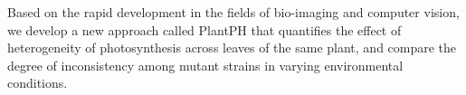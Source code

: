 \documentclass{bioinfo}
\begin{document}
Based on the rapid development in the fields of bio-imaging and computer vision, we develop a new approach called PlantPH that quantifies the effect of heterogeneity of photosynthesis across leaves of the same plant, and compare the degree of inconsistency among mutant strains in varying environmental conditions.

\end{document}

